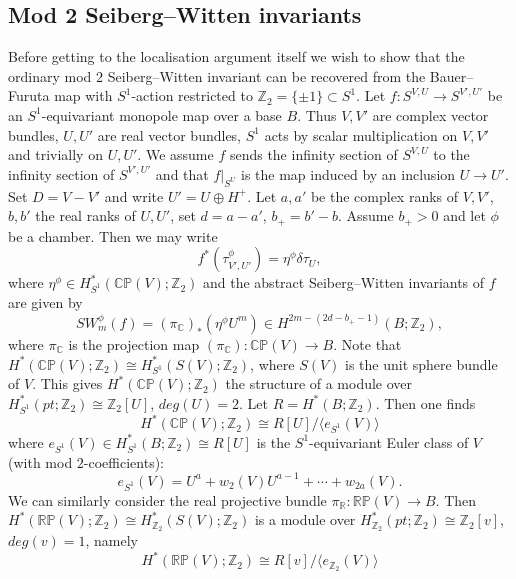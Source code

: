 \documentclass{amsart}
\theoremstyle{definition}
\theoremstyle{remark}
\numberwithin{equation}{section}
\begin{document}
\subsection{Mod 2 Seiberg--Witten invariants}\label{sec:z2restr}

Before getting to the localisation argument itself we wish to show that the ordinary mod $2$ Seiberg--Witten invariant can be recovered from the Bauer--Furuta map with $S^1$-action restricted to $\mathbb{Z}_2 = \{ \pm 1 \} \subset S^1$. Let $f : S^{V,U} \to S^{V',U'}$ be an $S^1$-equivariant monopole map over a base $B$. Thus $V,V'$ are complex vector bundles, $U,U'$ are real vector bundles, $S^1$ acts by scalar multiplication on $V,V'$ and trivially on $U,U'$. We assume $f$ sends the infinity section of $S^{V,U}$ to the infinity section of $S^{V',U'}$ and that $f|_{S^U}$ is the map induced by an inclusion $U \to U'$. Set $D = V -V'$ and write $U' = U \oplus H^+$. Let $a,a'$ be the complex ranks of $V,V'$, $b,b'$ the real ranks of $U,U'$, set $d = a-a'$, $b_+ = b'-b$. Assume $b_+ > 0$ and let $\phi$ be a chamber. Then we may write 
\[
f^*( \tau^\phi_{V',U'}) = \eta^\phi \delta \tau_U,
\]
where $\eta^\phi \in H^*_{S^1}( \mathbb{CP}(V) ; \mathbb{Z}_2)$ and the abstract Seiberg--Witten invariants of $f$ are given by 
\[
SW_m^\phi(f) = (\pi_{\mathbb{C}})_*( \eta^\phi U^m ) \in H^{2m-(2d-b_+-1)}(B ; \mathbb{Z}_2),
\]
where $\pi_{\mathbb{C}}$ is the projection map $(\pi_{\mathbb{C}}) : \mathbb{CP}(V) \to B$. Note that $H^*( \mathbb{CP}(V) ; \mathbb{Z}_2) \cong H^*_{S^1}( S(V) ; \mathbb{Z}_2)$, where $S(V)$ is the unit sphere bundle of $V$. This gives $H^*( \mathbb{CP}(V) ; \mathbb{Z}_2)$ the structure of a module over $H^*_{S^1}(pt ; \mathbb{Z}_2) \cong \mathbb{Z}_2[U]$, $deg(U) = 2$. Let $R = H^*(B ; \mathbb{Z}_2)$. Then one finds
\begin{equation}\label{equ:cp}
H^*( \mathbb{CP}(V) ; \mathbb{Z}_2) \cong R[U]/\langle e_{S^1}(V) \rangle
\end{equation}
where $e_{S^1}(V) \in H^*_{S^1}(B ; \mathbb{Z}_2) \cong R[U]$ is the $S^1$-equivariant Euler class of $V$ (with mod $2$-coefficients):
\[
e_{S^1}(V) = U^a + w_2(V) U^{a-1} + \cdots + w_{2a}(V).
\]
We can similarly consider the real projective bundle $\pi_{\mathbb{R}} : \mathbb{RP}(V) \to B$. Then $H^*( \mathbb{RP}(V) ; \mathbb{Z}_2) \cong H^*_{\mathbb{Z}_2}( S(V) ; \mathbb{Z}_2)$ is a module over $H^*_{\mathbb{Z}_2}(pt ; \mathbb{Z}_2) \cong \mathbb{Z}_2[v]$, $deg(v) = 1$, namely
\begin{equation}\label{equ:rp}
H^*(\mathbb{RP}(V) ; \mathbb{Z}_2) \cong R[v]/ \langle e_{\mathbb{Z}_2}(V) \rangle
\end{equation}
\end{document}
